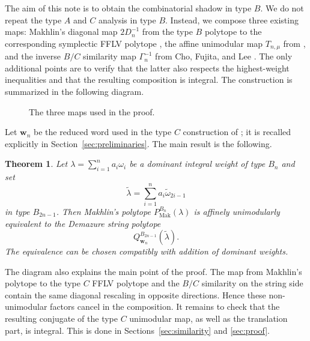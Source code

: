\documentclass[a4paper, 12pt]{amsart}
\newtheorem{theorem}{Theorem}[section]
\newcommand{\FFLV}{\mathrm{FFLV}}
\newcommand{\Mak}{\mathrm{Mak}}
\newcommand{\ww}{\mathbf w}
\begin{document}
The aim of this note is to obtain the combinatorial shadow in type $B$. We do not repeat the type $A$ and $C$ analysis in type $B$. Instead, we compose three existing maps: Makhlin's diagonal map $2D_n^{-1}$ from the type $B$ polytope to the corresponding symplectic FFLV polytope \cite[Remark~2.3]{Mak19}, the affine unimodular map $T_{n,\mu}$ from \cite{CFL24}, and the inverse $B/C$ similarity map $\Gamma_n^{-1}$ from Cho, Fujita, and Lee \cite{CFL25}. The only additional points are to verify that the latter also respects the highest-weight inequalities and that the resulting composition is integral. The construction is summarized in the following diagram.

\begin{figure}[ht]
\centering
{}
\caption{The three maps used in the proof.}
\label{fig:three-maps}
\end{figure}

Let $\ww_n$ be the reduced word used in the type $C$ construction of \cite{CFL24}; it is recalled explicitly in Section~\ref{sec:preliminaries}. The main result is the following.

\begin{theorem}\label{thm:main}
Let $\lambda=\sum_{i=1}^n a_i\omega_i$ be a dominant integral weight of type $B_n$ and set
\[
           \widetilde\lambda=\sum_{i=1}^n a_i\widetilde\omega_{2i-1}
\]
in type $B_{2n-1}$. Then Makhlin's polytope $P_{\Mak}^{B_n}(\lambda)$ is affinely unimodularly equivalent to the Demazure string polytope
\[
             Q_{\ww_n}^{B_{2n-1}}(\widetilde\lambda).
\]
The equivalence can be chosen compatibly with addition of dominant weights.
\end{theorem}

The diagram also explains the main point of the proof. The map from Makhlin's polytope to the type $C$ FFLV polytope and the $B/C$ similarity on the string side contain the same diagonal rescaling in opposite directions. Hence these non-unimodular factors cancel in the composition. It remains to check that the resulting conjugate of the type $C$ unimodular map, as well as the translation part, is integral. This is done in Sections~\ref{sec:similarity} and \ref{sec:proof}.
\end{document}
